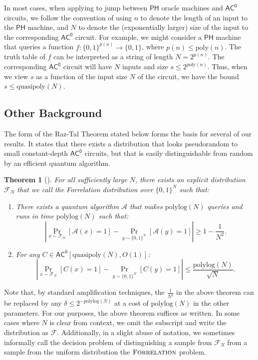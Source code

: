 \documentclass[10pt,a4paper]{article}
\newtheorem{theorem}{Theorem}
\newcommand{\poly}{\mathrm{poly}}
\newcommand{\polylog}{\mathrm{polylog}}
\newcommand{\quasipoly}{\mathrm{quasipoly}}
\newcommand{\Forrelation}{\normalfont\textsc{Forrelation}}
\begin{document}
In most cases, when applying  to jump between $\mathsf{PH}$ oracle machines and $\mathsf{AC^0}$ circuits, we follow the convention of using $n$ to denote the length of an input to the $\mathsf{PH}$ machine, and $N$ to denote the (exponentially larger) size of the input to the corresponding $\mathsf{AC^0}$ circuit. For example, we might consider a $\mathsf{PH}$ machine that queries a function $f: \{0,1\}^{p(n)} \to \{0,1\}$, where $p(n) \le \poly(n)$. The truth table of $f$ can be interpreted as a string of length $N = 2^{p(n)}$. The corresponding $\mathsf{AC^0}$ circuit will have $N$ inputs and size $s \le 2^{\poly(n)}$. Thus, when we view $s$ as a function of the input size $N$ of the circuit, we have the bound $s \le \quasipoly(N)$.

\subsection{Other Background}

The form of the Raz-Tal Theorem stated below forms the basis for several of our results. It states that there exists a distribution that looks pseudorandom to small constant-depth $\mathsf{AC^0}$ circuits, but that is easily distinguishable from random by an efficient quantum algorithm.

\begin{theorem}[{\cite[Theorem 1.2]{RT19}}]
\label{thm:raz-tal}
For all sufficiently large $N$, there exists an explicit distribution $\mathcal{F}_N$ that we call the \emph{Forrelation distribution} over $\{0,1\}^N$ such that:
\begin{enumerate}
\item There exists a quantum algorithm $\mathcal{A}$ that makes $\polylog(N)$ queries and runs in time $\polylog(N)$ such that:
\[
\left|\Pr_{x \sim \mathcal{F}_N} [\mathcal{A}(x) = 1] - \Pr_{y \sim \{0,1\}^{N}} [\mathcal{A}(y) = 1]  \right| \ge 1 - \frac{1}{N^2}.
\]
\item For any $C \in \mathsf{AC^0}[\quasipoly(N),O(1)]$:
\[
\left|\Pr_{x \sim \mathcal{F}_N} [C(x) = 1] - \Pr_{y \sim \{0,1\}^{N}} [C(y) = 1]  \right| \le \frac{\polylog(N)}{\sqrt{N}}.
\]
\end{enumerate}
\end{theorem}
Note that, by standard amplification techniques, the $\frac{1}{N^2}$ in the above theorem can be replaced by any $\delta \le 2^{-\polylog(N)}$ at a cost of $\polylog(N)$ in the other parameters. For our purposes, the above theorem suffices as written. In some cases where $N$ is clear from context, we omit the subscript and write the distribution as $\mathcal{F}$. Additionally, in a slight abuse of notation, we sometimes informally call the decision problem of distinguishing a sample from $\mathcal{F}_N$ from a sample from the uniform distribution the $\Forrelation$ problem.
\end{document}
